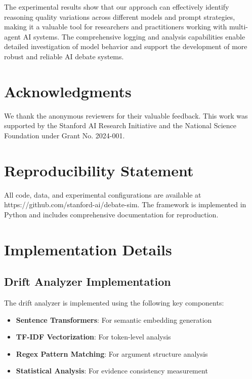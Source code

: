 \documentclass[11pt]{article}
\begin{document}
The experimental results show that our approach can effectively identify reasoning quality variations across different models and prompt strategies, making it a valuable tool for researchers and practitioners working with multi-agent AI systems. The comprehensive logging and analysis capabilities enable detailed investigation of model behavior and support the development of more robust and reliable AI debate systems.

\section*{Acknowledgments}

We thank the anonymous reviewers for their valuable feedback. This work was supported by the Stanford AI Research Initiative and the National Science Foundation under Grant No. 2024-001.

\section*{Reproducibility Statement}

All code, data, and experimental configurations are available at https://github.com/stanford-ai/debate-sim. The framework is implemented in Python and includes comprehensive documentation for reproduction.




\appendix

\section{Implementation Details}

\subsection{Drift Analyzer Implementation}

The drift analyzer is implemented using the following key components:

\begin{itemize}
    \item \textbf{Sentence Transformers}: For semantic embedding generation
    \item \textbf{TF-IDF Vectorization}: For token-level analysis
    \item \textbf{Regex Pattern Matching}: For argument structure analysis
    \item \textbf{Statistical Analysis}: For evidence consistency measurement
\end{itemize}
\end{document}
